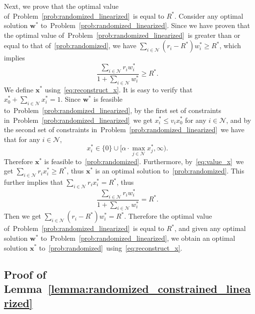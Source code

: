 \documentclass[mnsc,non-blindrev]{informs3}
\theoremstyle{definition}
\begin{document}
\begin{appendices}{\Large{}}
Next, we prove that the optimal value of~Problem~\eqref{prob:randomized_linearized}~is equal to $R^*$. Consider any optimal solution $\bm{w}^*$ to~Problem~\eqref{prob:randomized_linearized}. Since we have proven that the optimal value of~Problem~\eqref{prob:randomized_linearized}~is greater than or equal to that of~\ref{prob:randomized}, we have
$\sum_{i\in\mathcal{N}}(r_i-R^*)w_i^*\geq R^*$, which implies
\begin{equation}
\dfrac{\sum_{i\in\mathcal{N}}r_iw_i^*}{1+\sum_{i\in\mathcal{N}}w_i^*}\geq R^*.\label{eq:value_x}
\end{equation}
We define $\bm{x}^*$ using~\eqref{eq:reconstruct_x}. It is easy to verify that $x_0^*+\sum_{i\in\mathcal{N}}x_i^*=1$. Since $\bm{w}^*$ is feasible to~Problem~\eqref{prob:randomized_linearized}, by the first set of constraints in~Problem~\eqref{prob:randomized_linearized}~we get $x_i^*\leq v_ix_0^*$ for any $i\in\mathcal{N}$, and by the second set of constraints in~Problem~\eqref{prob:randomized_linearized}~we have that for any $i\in\mathcal{N}$,
\begin{equation*}
x_i^*\in\{0\}\cup\Big[\alpha\cdot\max_{j\in\mathcal{N}}x_j^*,\infty\Big).
\end{equation*}
Therefore $\bm{x}^*$ is feasible to~\ref{prob:randomized}. Furthermore, by~\eqref{eq:value_x}~we get $\sum_{i\in\mathcal{N}}r_ix_i^*\geq R^*$, thus $\bm{x}^*$ is an optimal solution to~\ref{prob:randomized}. This further implies that $\sum_{i\in\mathcal{N}}r_ix_i^*=R^*$, thus
\begin{equation*}
\dfrac{\sum_{i\in\mathcal{N}}r_iw_i^*}{1+\sum_{i\in\mathcal{N}}w_i^*}=R^*.
\end{equation*}
Then we get $\sum_{i\in\mathcal{N}}(r_i-R^*)w_i^*=R^*$. Therefore the optimal value of~Problem~\eqref{prob:randomized_linearized}~is equal to $R^*$, and given any optimal solution $\bm{w}^*$ to~Problem~\eqref{prob:randomized_linearized}, we obtain an optimal solution $\bm{x}^*$ to~\ref{prob:randomized}~using~\eqref{eq:reconstruct_x}.

\subsection{Proof of Lemma~\ref{lemma:randomized_constrained_linearized}}\label{sec:lemma:randomized_constrained_linearized}


\end{appendices}
\end{document}
